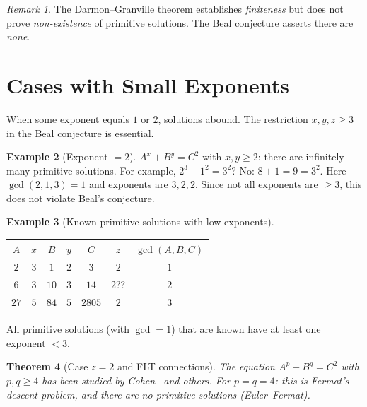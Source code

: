 \documentclass[12pt,a4paper]{amsart}
\newtheorem{theorem}{Theorem}[section]
\theoremstyle{definition}
\newtheorem{example}[theorem]{Example}
\theoremstyle{remark}
\newtheorem{remark}[theorem]{Remark}
\begin{document}
\begin{remark}
The Darmon--Granville theorem establishes \emph{finiteness} but does not prove
\emph{non-existence} of primitive solutions. The Beal conjecture asserts there
are \emph{none}.
\end{remark}

\section{Cases with Small Exponents}

When some exponent equals $1$ or $2$, solutions abound. The restriction $x,y,z \geq 3$
in the Beal conjecture is essential.

\begin{example}[Exponent $= 2$]
$A^x + B^y = C^2$ with $x,y \geq 2$: there are infinitely many primitive solutions.
For example, $2^3 + 1^2 = 3^2$? No: $8 + 1 = 9 = 3^2$. Here $\gcd(2,1,3) = 1$
and exponents are $3, 2, 2$. Since not all exponents are $\geq 3$, this does not
violate Beal's conjecture.
\end{example}

\begin{example}[Known primitive solutions with low exponents]
\begin{center}
\begin{tabular}{ccccccc}
\toprule
$A$ & $x$ & $B$ & $y$ & $C$ & $z$ & $\gcd(A,B,C)$ \\
\midrule
$2$ & $3$ & $1$ & $2$ & $3$ & $2$ & $1$ \\
$6$ & $3$ & $10$ & $3$ & $14$ & $2$?? & $2$ \\
$27$ & $5$ & $84$ & $5$ & $2805$ & $2$ & $3$ \\
\bottomrule
\end{tabular}
\end{center}
All primitive solutions (with $\gcd = 1$) that are known have at least one exponent $< 3$.
\end{example}

\begin{theorem}[Case $z = 2$ and FLT connections]\label{thm:z2}
The equation $A^p + B^q = C^2$ with $p, q \geq 4$ has been studied by
Cohen~\cite{Cohen07} and others. For $p = q = 4$: this is Fermat's descent
problem, and there are no primitive solutions (Euler--Fermat).
\end{theorem}
\end{document}

